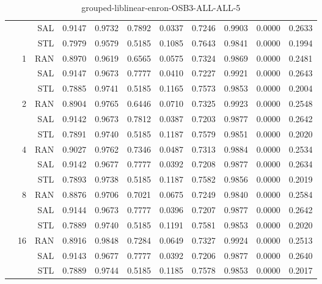 \begin{center}
\begin{table}[htbp]
\begin{center}
\begin{tabular}{ | r | r | r | r | r | r | r | r | r | r | r |}
 &   & SAL & 0.9147 & 0.9732 & 0.7892 & 0.0337 & 0.7246 & 0.9903 & 0.0000 & 0.2633\\ \cline{3-11}
 &   & STL & 0.7979 & 0.9579 & 0.5185 & 0.1085 & 0.7643 & 0.9841 & 0.0000 & 0.1994\\ \cline{2-11}
 & \multirow{3}{*}{1} & RAN & 0.8970 & 0.9619 & 0.6565 & 0.0575 & 0.7324 & 0.9869 & 0.0000 & 0.2481\\ \cline{3-11}
 &   & SAL & 0.9147 & 0.9673 & 0.7777 & 0.0410 & 0.7227 & 0.9921 & 0.0000 & 0.2643\\ \cline{3-11}
 &   & STL & 0.7885 & 0.9741 & 0.5185 & 0.1165 & 0.7573 & 0.9853 & 0.0000 & 0.2004\\ \cline{2-11}
 & \multirow{3}{*}{2} & RAN & 0.8904 & 0.9765 & 0.6446 & 0.0710 & 0.7325 & 0.9923 & 0.0000 & 0.2548\\ \cline{3-11}
 &   & SAL & 0.9142 & 0.9673 & 0.7812 & 0.0387 & 0.7203 & 0.9877 & 0.0000 & 0.2642\\ \cline{3-11}
 &   & STL & 0.7891 & 0.9740 & 0.5185 & 0.1187 & 0.7579 & 0.9851 & 0.0000 & 0.2020\\ \cline{2-11}
 & \multirow{3}{*}{4} & RAN & 0.9027 & 0.9762 & 0.7346 & 0.0487 & 0.7313 & 0.9884 & 0.0000 & 0.2534\\ \cline{3-11}
 &   & SAL & 0.9142 & 0.9677 & 0.7777 & 0.0392 & 0.7208 & 0.9877 & 0.0000 & 0.2634\\ \cline{3-11}
 &   & STL & 0.7893 & 0.9738 & 0.5185 & 0.1187 & 0.7582 & 0.9856 & 0.0000 & 0.2019\\ \cline{2-11}
 & \multirow{3}{*}{8} & RAN & 0.8876 & 0.9706 & 0.7021 & 0.0675 & 0.7249 & 0.9840 & 0.0000 & 0.2584\\ \cline{3-11}
 &   & SAL & 0.9144 & 0.9673 & 0.7777 & 0.0396 & 0.7207 & 0.9877 & 0.0000 & 0.2642\\ \cline{3-11}
 &   & STL & 0.7889 & 0.9740 & 0.5185 & 0.1191 & 0.7581 & 0.9853 & 0.0000 & 0.2020\\ \cline{2-11}
 & \multirow{3}{*}{16} & RAN & 0.8916 & 0.9848 & 0.7284 & 0.0649 & 0.7327 & 0.9924 & 0.0000 & 0.2513\\ \cline{3-11}
 &   & SAL & 0.9143 & 0.9677 & 0.7777 & 0.0392 & 0.7206 & 0.9877 & 0.0000 & 0.2640\\ \cline{3-11}
 &   & STL & 0.7889 & 0.9744 & 0.5185 & 0.1185 & 0.7578 & 0.9853 & 0.0000 & 0.2017\\ \cline{2-11}
\hline
\end{tabular}
\caption{grouped-liblinear-enron-OSB3-ALL-ALL-5}
\end{center}
 \end{table}
\end{center}

